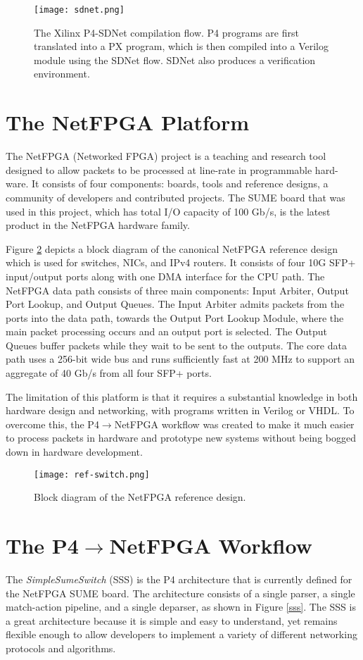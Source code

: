 \begin{figure}[!h]
	\centering
	\texttt{[image: sdnet.png]}
	\caption{The Xilinx P4-SDNet compilation flow. P4 programs are first translated into a PX program, which is then compiled into a Verilog module using the SDNet flow. SDNet also produces a verification environment.}
	\label{sdnet}
\end{figure}

\section{The NetFPGA Platform}
The NetFPGA (Networked FPGA) project is a teaching and research tool designed to allow packets to be processed at line-rate in programmable hard-ware. It consists of four components: boards, tools and reference designs, a community of developers and contributed projects. The SUME board that was used in this project, which has total I/O capacity of 100 Gb/s, is the latest product in the NetFPGA hardware family. 

Figure \ref{ref-switch} depicts a block diagram of the canonical NetFPGA reference design which is used for switches, NICs, and IPv4 routers. It consists of four 10G SFP+ input/output ports along with one DMA interface for the CPU path. The NetFPGA data path consists of three main components: Input Arbiter, Output Port Lookup, and Output Queues. The Input Arbiter admits packets from the ports into the data path, towards the Output Port Lookup Module, where the main packet processing occurs and an output port is selected. The Output Queues buffer packets while they wait to be sent to the outputs. The core data path uses a 256-bit wide bus and runs sufficiently fast at 200 MHz to support an aggregate of 40 Gb/s from all four SFP+ ports.

The limitation of this platform is that it requires a substantial knowledge in both hardware design and networking, with programs written in Verilog or VHDL. To overcome this, the P4$\rightarrow$NetFPGA workflow was created to make it much easier to process packets in hardware and prototype new systems without being bogged down in hardware development.

\begin{figure}[!ht]
	\centering
	\texttt{[image: ref-switch.png]}
	\caption{Block diagram of the NetFPGA reference design.}
	\label{ref-switch}
\end{figure}

\section{The P4$\rightarrow$NetFPGA Workflow}
The \textit{SimpleSumeSwitch} (SSS) is the P4 architecture that is currently defined for the NetFPGA SUME board. The architecture consists of a single parser, a single match-action pipeline, and a single deparser, as shown in Figure \ref{sss}. The SSS is a great architecture because it is simple and easy to understand, yet remains flexible enough to allow developers to implement a variety of different networking protocols and algorithms. 

